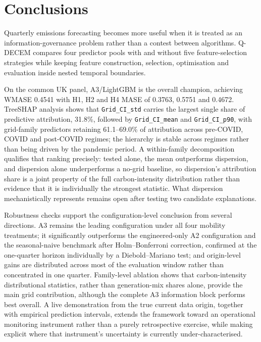 \documentclass[preprint,12pt]{elsarticle}
\newcommand{\qdecem}{Q-DECEM}
\begin{document}
\section{Conclusions}\label{sec:conclusion}

Quarterly emissions forecasting becomes more useful when it is treated as an information-governance problem rather than a contest between algorithms. \qdecem{} compares four predictor pools with and without five feature-selection strategies while keeping feature construction, selection, optimisation and evaluation inside nested temporal boundaries.

On the common UK panel, A3/LightGBM is the overall champion, achieving WMASE 0.4541 with H1, H2 and H4 MASE of 0.3763, 0.5751 and 0.4672. TreeSHAP analysis shows that \texttt{Grid\_CI\_std} carries the largest single share of predictive attribution, 31.8\%, followed by \texttt{Grid\_CI\_mean} and \texttt{Grid\_CI\_p90}, with grid-family predictors retaining 61.1--69.0\% of attribution across pre-COVID, COVID and post-COVID regimes; the hierarchy is stable across regimes rather than being driven by the pandemic period. A within-family decomposition qualifies that ranking precisely: tested alone, the mean outperforms dispersion, and dispersion alone underperforms a no-grid baseline, so dispersion's attribution share is a joint property of the full carbon-intensity distribution rather than evidence that it is individually the strongest statistic. What dispersion mechanistically represents remains open after testing two candidate explanations.

Robustness checks support the configuration-level conclusion from several directions. A3 remains the leading configuration under all four mobility treatments; it significantly outperforms the engineered-only A2 configuration and the seasonal-naive benchmark after Holm--Bonferroni correction, confirmed at the one-quarter horizon individually by a Diebold--Mariano test; and origin-level gains are distributed across most of the evaluation window rather than concentrated in one quarter. Family-level ablation shows that carbon-intensity distributional statistics, rather than generation-mix shares alone, provide the main grid contribution, although the complete A3 information block performs best overall. A live demonstration from the true current data origin, together with empirical prediction intervals, extends the framework toward an operational monitoring instrument rather than a purely retrospective exercise, while making explicit where that instrument's uncertainty is currently under-characterised.
\end{document}
